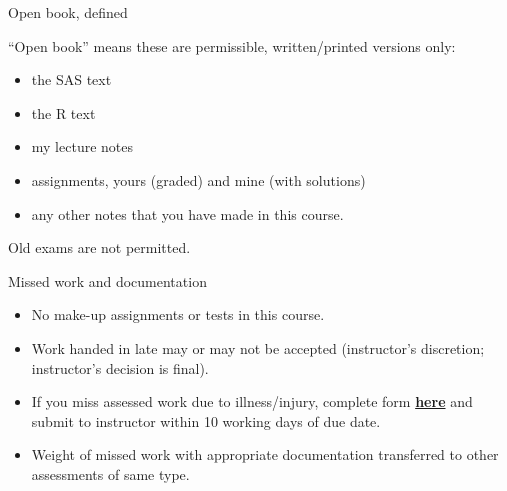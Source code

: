 \documentclass[ignorenonframetext,]{beamer}
\providecommand{\tightlist}{%
  \setlength{\itemsep}{0pt}\setlength{\parskip}{0pt}}
\begin{document}
\begin{frame}{Open book, defined}
\protect\hypertarget{open-book-defined}{}

``Open book'' means these are permissible, written/printed versions
only:

\begin{itemize}
\tightlist
\item
  the SAS text
\item
  the R text
\item
  my lecture notes
\item
  assignments, yours (graded) and mine (with solutions)
\item
  any other notes that you have made in this course.
\end{itemize}

Old exams are not permitted.

\end{frame}

\begin{frame}{Missed work and documentation}
\protect\hypertarget{missed-work-and-documentation}{}

\begin{itemize}
\tightlist
\item
  No make-up assignments or tests in this course.
\item
  Work handed in late may or may not be accepted (instructor's
  discretion; instructor's decision is final).
\item
  If you miss assessed work due to illness/injury, complete form
  \href{http://www.illnessverification.utoronto.ca/}{\textbf{here}} and
  submit to instructor within 10 working days of due date.
\item
  Weight of missed work with appropriate documentation transferred to
  other assessments of same type.
\end{itemize}

\end{frame}
\end{document}
